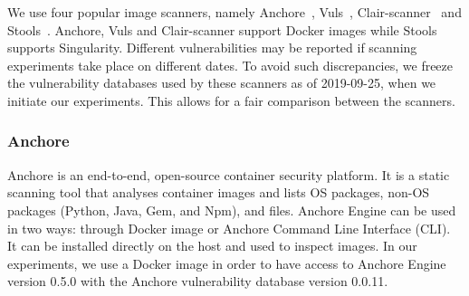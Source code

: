 \documentclass[a4paper,num-refs]{oup-contemporary}
\begin{document}


We use four popular image scanners, namely Anchore~\cite{github_2019},
Vuls~\cite{future-architect_2019}, Clair-scanner~\cite{arminc_2019} and
Stools~\cite{stools}. Anchore, Vuls and Clair-scanner support Docker
images while Stools supports Singularity. Different vulnerabilities may be
reported if scanning experiments take place on different dates.
To avoid such discrepancies, we freeze the vulnerability
databases used by these scanners as of 2019-09-25, when we initiate our
experiments. This allows for a fair comparison between the scanners.


\subsubsection{Anchore}

Anchore is an end-to-end, open-source container security platform. It
is a static
scanning tool that analyses container images and lists OS
packages, non-OS packages (Python, Java, Gem, and Npm), and files.
Anchore Engine can be used in two ways: through Docker image or Anchore
Command Line Interface (CLI).
It can be
installed directly on the host and used to inspect images.
In our experiments, we use a Docker image in order to have access to Anchore Engine version 0.5.0 with the 
Anchore vulnerability database version 0.0.11.
\end{document}
